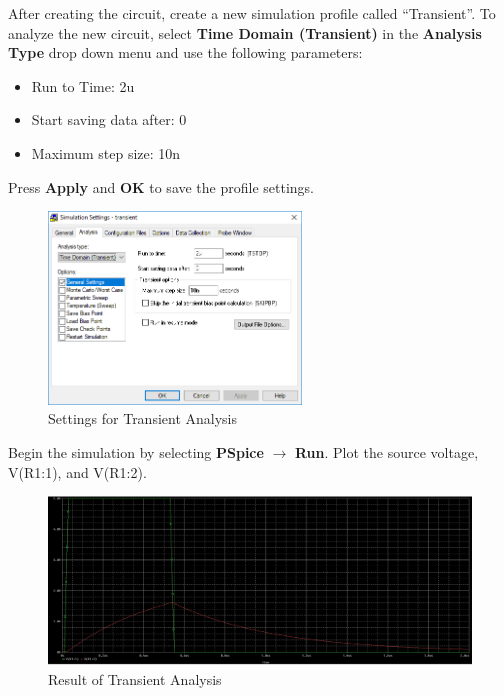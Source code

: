 \documentclass[12pt]{../manual}
\begin{document}
After creating the circuit, create a new simulation profile called ``Transient''. To analyze the new circuit, select \textbf{Time Domain (Transient)} in the \textbf{Analysis Type} drop down menu and use the following parameters:
\begin{itemize}
\item Run to Time: 2u
\item Start saving data after: 0
\item Maximum step size: 10n
\end{itemize}
Press \textbf{Apply} and \textbf{OK} to save the profile settings. 

\begin{figure}[ht!]
	\begin{center}
		\includegraphics[width=0.6\textwidth]{figures/TransientAnalysisSettings.PNG}
	\end{center}
	\caption{Settings for Transient Analysis}
	\label{fig:transSettings}
\end{figure}

Begin the simulation by selecting \textbf{PSpice} $\to$ \textbf{Run}. Plot the source voltage, V(R1:1), and V(R1:2).

\begin{figure}[ht!]
	\begin{center}
		\includegraphics[width=\textwidth]{figures/ResultTransientAnalysisCrop.PNG}
	\end{center}
	\caption{Result of Transient Analysis}
	\label{fig:transAnalRes}
\end{figure}
%
\newpage
\end{document}
